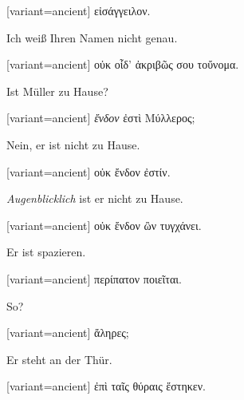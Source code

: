 \begin{greek}[variant=ancient]%
εἰσάγγειλον.

\end{greek}%
\switchcolumn*

Ich weiß Ihren Namen nicht genau.

\switchcolumn

\begin{greek}[variant=ancient]%
οὐκ οἶδ’ ἀκριβῶς σου τοὔνομα.

\end{greek}%
\switchcolumn*

Ist Müller zu Hause?

\switchcolumn

\begin{greek}[variant=ancient]%
\emph{ἔνδον} ἐστὶ Μύλλερος;

\end{greek}%
\switchcolumn*

Nein, er ist nicht zu Hause.

\switchcolumn

\begin{greek}[variant=ancient]%
οὐκ ἔνδον ἐστίν.

\end{greek}%
\switchcolumn*

\emph{Augenblicklich} ist er nicht zu Hause.

\switchcolumn

\begin{greek}[variant=ancient]%
οὐκ ἔνδον ὢν τυγχάνει.

\end{greek}%
\switchcolumn*

Er ist spazieren.

\switchcolumn

\begin{greek}[variant=ancient]%
περίπατον ποιεῖται.

\end{greek}%
\switchcolumn*

So?

\switchcolumn

\begin{greek}[variant=ancient]%
ἄληρες;

\end{greek}%
\switchcolumn*

Er steht an der Thür.

\switchcolumn

\begin{greek}[variant=ancient]%
ἐπὶ ταῖς θύραις ἕστηκεν.

\end{greek}%
\switchcolumn*

